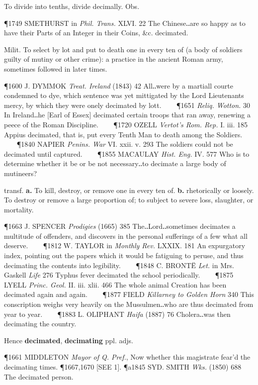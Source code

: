 \begin{description}[wide, labelwidth=!, labelindent=0pt]
\begin{myenumerate}
 To divide into tenths, divide decimally. Obs.

\P 1749 SMETHURST in  \textit{Phil. Trans.} XLVI. 22 The Chinese‥are so happy as to have their Parts of an Integer in their Coins, \&c. decimated.

 Milit. To select by lot and put to death one in every ten of (a body of soldiers guilty of mutiny or other crime): a practice in the ancient Roman army, sometimes followed in later times.

\P 1600 J. DYMMOK  \textit{Treat. Ireland} (1843) 42 All‥were by a martiall courte condemned to dye, which sentence was yet mittigated by the Lord Lieutenants mercy, by which they were onely decimated by lott.    
\P 1651  \textit{Reliq. Wotton.} 30 In Ireland‥he [Earl of Essex] decimated certain troops that ran away, renewing a peece of the Roman Discipline.    
\P 1720 OZELL  \textit{Vertot's Rom. Rep.} I. iii. 185 Appius decimated, that is, put every Tenth Man to death among the Soldiers.    
\P 1840 NAPIER  \textit{Penins. War} VI. xxii. v. 293 The soldiers could not be decimated until captured.    
\P 1855 MACAULAY  \textit{Hist. Eng.} IV. 577 Who is to determine whether it be or be not necessary‥to decimate a large body of mutineers?

 transf. \textbf{a.} To kill, destroy, or remove one in every ten of. \textbf{b.} rhetorically or loosely. To destroy or remove a large proportion of; to subject to severe loss, slaughter, or mortality.

\P 1663 J. SPENCER  \textit{Prodigies} (1665) 385 The‥Lord‥sometimes decimates a multitude of offenders, and discovers in the personal sufferings of a few what all deserve.    
\P 1812 W. TAYLOR in  \textit{Monthly Rev.} LXXIX. 181 An expurgatory index, pointing out the papers which it would be fatiguing to peruse, and thus decimating the contents into legibility.    
\P 1848 C. BRONTË  \textit{Let.} in Mrs. Gaskell \textit{Life} 276 Typhus fever decimated the school periodically.    
\P 1875 LYELL  \textit{Princ. Geol.} II. iii. xlii. 466 The whole animal Creation has been decimated again and again.    
\P 1877 FIELD  \textit{Killarney to Golden Horn} 340 This conscription weighs very heavily on the Mussulmen‥who are thus decimated from year to year.    
\P 1883 L. OLIPHANT  \textit{Haifa} (1887) 76 Cholera‥was then decimating the country.

Hence \textbf{decimated}, \textbf{decimating} ppl. adjs.

\P 1661 MIDDLETON  \textit{Mayor of Q. Pref.}, Now whether this magistrate fear'd the decimating times.
\P 1667,1670 [SEE 1].
\P a1845 SYD. SMITH  \textit{Wks.} (1850) 688 The decimated person.
\end{myenumerate}



\end{description}
